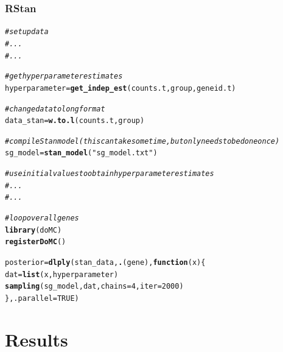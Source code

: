 \documentclass[handout]{beamer}\usepackage[]{graphicx}\usepackage[]{color}
\makeatletter
\newcommand{\hlnum}[1]{\textcolor[rgb]{0.686,0.059,0.569}{#1}}%
\newcommand{\hlstr}[1]{\textcolor[rgb]{0.192,0.494,0.8}{#1}}%
\newcommand{\hlcom}[1]{\textcolor[rgb]{0.678,0.584,0.686}{\textit{#1}}}%
\newcommand{\hlstd}[1]{\textcolor[rgb]{0.345,0.345,0.345}{#1}}%
\newcommand{\hlkwa}[1]{\textcolor[rgb]{0.161,0.373,0.58}{\textbf{#1}}}%
\newcommand{\hlkwb}[1]{\textcolor[rgb]{0.69,0.353,0.396}{#1}}%
\newcommand{\hlkwc}[1]{\textcolor[rgb]{0.333,0.667,0.333}{#1}}%
\newcommand{\hlkwd}[1]{\textcolor[rgb]{0.737,0.353,0.396}{\textbf{#1}}}%
\newenvironment{kframe}{%
 \def\at@end@of@kframe{}%
 \ifinner\ifhmode%
  \def\at@end@of@kframe{\end{minipage}}%
  \begin{minipage}{\columnwidth}%
 \fi\fi%
 \def\FrameCommand##1{\hskip\@totalleftmargin \hskip-\fboxsep
 \colorbox{shadecolor}{##1}\hskip-\fboxsep
     \hskip-\linewidth \hskip-\@totalleftmargin \hskip\columnwidth}%
 \MakeFramed {\advance\hsize-\width
   \@totalleftmargin\z@ \linewidth\hsize
   \@setminipage}}%
 {\par\unskip\endMakeFramed%
 \at@end@of@kframe}
\newenvironment{knitrout}{}{} %
\makeatother
\begin{document}
\begin{frame}[fragile]
\frametitle{RStan}

\begin{knitrout}\tiny
{}\color{fgcolor}\begin{kframe}
\begin{alltt}
\hlcom{# set up data}
\hlcom{# ...}
\hlcom{# ...}

\hlcom{# get hyperparameter estimates}
\hlstd{hyperparameter} \hlkwb{=} \hlkwd{get_indep_est}\hlstd{(counts.t,group,geneid.t)}

\hlcom{# change data to long format}
\hlstd{data_stan} \hlkwb{=} \hlkwd{w.to.l}\hlstd{(counts.t,group)}

\hlcom{# compile Stan model (this can take some time, but only needs to be done once)}
\hlstd{sg_model} \hlkwb{=} \hlkwd{stan_model}\hlstd{(}\hlstr{"sg_model.txt"}\hlstd{)}

\hlcom{# use initial values to obtain hyperparameter estimates}
\hlcom{# ...}
\hlcom{# ...}

\hlcom{# loop over all genes}
\hlkwd{library}\hlstd{(doMC)}
\hlkwd{registerDoMC}\hlstd{()}

\hlstd{posterior} \hlkwb{=} \hlkwd{dlply}\hlstd{(stan_data,} \hlkwd{.}\hlstd{(gene),} \hlkwa{function}\hlstd{(}\hlkwc{x}\hlstd{) \{}
  \hlstd{dat} \hlkwb{=} \hlkwd{list}\hlstd{(x, hyperparameter)}
  \hlkwd{sampling}\hlstd{(sg_model, dat,} \hlkwc{chains}\hlstd{=}\hlnum{4}\hlstd{,} \hlkwc{iter}\hlstd{=}\hlnum{2000}\hlstd{)}
\hlstd{\},} \hlkwc{.parallel}\hlstd{=}\hlnum{TRUE}\hlstd{)}
\end{alltt}
\end{kframe}
\end{knitrout}

\end{frame}


\section{Results}
\end{document}
